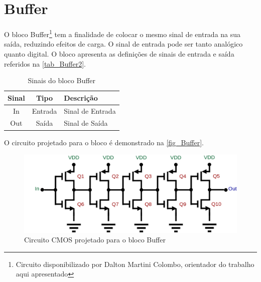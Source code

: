 \renewcommand{\NomeBloco}{Buffer}
\renewcommand{\NomePTab}{tab_\NomeBloco}
\renewcommand{\NomeSTab}{tab_\NomeBloco2}
\renewcommand{\NomePFig}{fig_\NomeBloco}
\renewcommand{\NomeSFig}{fig_\NomeBloco2}
\renewcommand{\NomeTTab}{tab_\NomeBloco3}

\section{Buffer}
\label{buffer}

O bloco \NomeBloco{}\footnote{Circuito disponibilizado por Dalton Martini Colombo, orientador do trabalho aqui apresentado} tem a finalidade de colocar o mesmo sinal de entrada na sua sa\'ida, reduzindo efeitos de carga. O sinal de entrada pode ser tanto anal\'ogico quanto digital. O bloco apresenta as definições de sinais de entrada e sa\'ida referidos na \autoref{\NomeSTab}.

\begin{table}[htb]
\caption{Sinais do bloco \NomeBloco}
\label{\NomeSTab}
\centering
\begin{tabular}{ccl}

    \toprule
    Sinal & Tipo    & Descrição        \\
    \midrule \midrule
    In    & Entrada & Sinal de Entrada \\
    \midrule
    Out   & Saída   & Sinal de Sa\'ida   \\
    \bottomrule
\end{tabular}
\end{table}

O circuito projetado para o bloco \'e demonstrado na \autoref{\NomePFig}.

\begin{figure}[htb]
 \centering
    \caption{\label{\NomePFig}Circuito CMOS projetado para o bloco \NomeBloco}
    \includegraphics[scale=0.3]{Circuitos/Buffer.png}
\end{figure}

